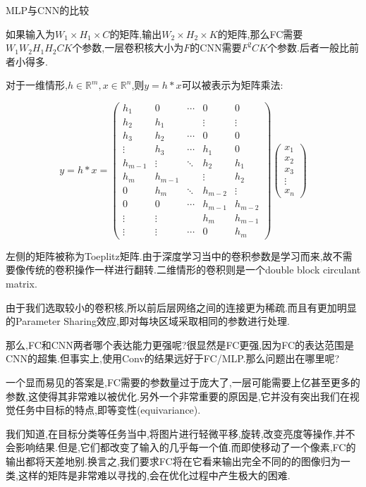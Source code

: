 MLP与CNN的比较

如果输入为$W_1 \times H_1 \times C$的矩阵,输出$W_2 \times H_2 \times K$的矩阵,那么FC需要$W_1W_2H_1H_2CK$个参数,一层卷积核大小为$F$的CNN需要$F^2CK$个参数.后者一般比前者小得多.

对于一维情形,$h \in \mathbb R^m, x\in \mathbb R^n$,则$y = h * x$可以被表示为矩阵乘法:

\begin{equation}
	y=h * x=
	\begin{pmatrix}
		h_{1} & 0 & \cdots & 0 & 0 \\
		h_{2} & h_{1} & & \vdots & \vdots \\
		h_{3} & h_{2} & \cdots & 0 & 0 \\
		\vdots & h_{3} & \cdots & h_{1} & 0 \\
		h_{m-1} & \vdots & \ddots & h_{2} & h_{1} \\
		h_{m} & h_{m-1} & & \vdots & h_{2} \\
		0 & h_{m} & \ddots & h_{m-2} & \vdots \\
		0 & 0 & \cdots & h_{m-1} & h_{m-2} \\
		\vdots & \vdots & & h_{m} & h_{m-1}\\
		\vdots &\vdots & \cdots  &0 & h_{m}
	\end{pmatrix}
	\begin{pmatrix}
		x_{1} \\
		x_{2} \\
		x_{3} \\
		\vdots \\
		x_{n}
	\end{pmatrix}
\end{equation}

左侧的矩阵被称为Toeplitz矩阵.由于深度学习当中的卷积参数是学习而来,故不需要像传统的卷积操作一样进行翻转.二维情形的卷积则是一个double block circulant matrix.

由于我们选取较小的卷积核,所以前后层网络之间的连接更为稀疏.而且有更加明显的Parameter Sharing效应,即对每块区域采取相同的参数进行处理.

那么,FC和CNN两者哪个表达能力更强呢?很显然是FC更强,因为FC的表达范围是CNN的超集.但事实上,使用Conv的结果远好于FC/MLP.那么问题出在哪里呢?

一个显而易见的答案是,FC需要的参数量过于庞大了,一层可能需要上亿甚至更多的参数,这使得其非常难以被优化.另外一个非常重要的原因是,它并没有突出我们在视觉任务中目标的特点,即等变性(equivariance).

我们知道,在目标分类等任务当中,将图片进行轻微平移,旋转,改变亮度等操作,并不会影响结果.但是,它们都改变了输入的几乎每一个值.而即使移动了一个像素,FC的输出都将天差地别.换言之,我们要求FC将在它看来输出完全不同的的图像归为一类,这样的矩阵是非常难以寻找的,会在优化过程中产生极大的困难.

